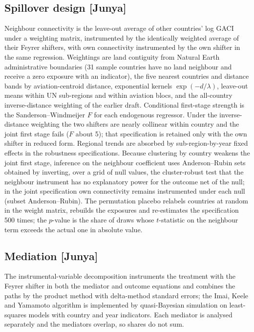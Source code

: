 \documentclass[12pt]{article}
\begin{document}
\subsection*{Spillover design [Junya]}
Neighbour connectivity is the leave-out average of other countries' log
GACI under a weighting matrix, instrumented by the identically weighted
average of their Feyrer shifters, with own connectivity instrumented by the
own shifter in the same regression. Weightings are land contiguity from
Natural Earth administrative boundaries (31 sample countries have no land
neighbour and receive a zero exposure with an indicator), the five nearest
countries and distance bands by aviation-centroid distance, exponential
kernels $\exp(-d/\lambda)$, leave-out means within UN sub-regions and
within aviation blocs, and the all-country inverse-distance weighting of
the earlier draft. Conditional first-stage strength is the
Sanderson--Windmeijer $F$ for each endogenous regressor. Under the
inverse-distance weighting the two shifters are nearly collinear within
country and the joint first stage fails ($F$ about 5); that specification
is retained only with the own shifter in reduced form. Regional trends are
absorbed by sub-region-by-year fixed effects in the robustness
specifications. Because clustering by country weakens the joint first
stage, inference on the neighbour coefficient uses Anderson--Rubin sets
obtained by inverting, over a grid of null values, the cluster-robust test
that the neighbour instrument has no explanatory power for the outcome net
of the null; in the joint specification own connectivity remains
instrumented under each null (subset Anderson--Rubin). The permutation placebo relabels countries at random in
the weight matrix, rebuilds the exposures and re-estimates the
specification 500 times; the $p$-value is the share of draws whose
$t$-statistic on the neighbour term exceeds the actual one in absolute
value.

\subsection*{Mediation [Junya]}
The instrumental-variable decomposition instruments the treatment with the
Feyrer shifter in both the mediator and outcome equations and combines the
paths by the product method with delta-method standard errors; the Imai,
Keele and Yamamoto algorithm is implemented by quasi-Bayesian simulation on
least-squares models with country and year indicators. Each mediator is
analysed separately and the mediators overlap, so shares do not sum.
\end{document}
